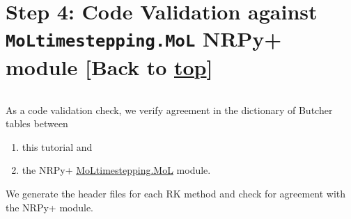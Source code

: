 \documentclass[landscape,letterpaper,10pt,english]{article}
\providecommand{\tightlist}{%
      \setlength{\itemsep}{0pt}\setlength{\parskip}{0pt}}
\begin{document}
    \hypertarget{step-4-code-validation-against-moltimestepping.mol-nrpy-module-back-to-top}{%
\section{\texorpdfstring{Step 4: Code Validation against
\texttt{MoLtimestepping.MoL} NRPy+ module {[}Back to
\hyperref[toc]{top}{]}}{Step 4: Code Validation against MoLtimestepping.MoL NRPy+ module {[}Back to {]}}}\label{step-4-code-validation-against-moltimestepping.mol-nrpy-module-back-to-top}}

\[\label{code_validation}\]

As a code validation check, we verify agreement in the dictionary of
Butcher tables between

\begin{enumerate}
\def\labelenumi{\arabic{enumi}.}
\tightlist
\item
  this tutorial and
\item
  the NRPy+ \href{../edit/MoLtimestepping/MoL.py}{MoLtimestepping.MoL}
  module.
\end{enumerate}

We generate the header files for each RK method and check for agreement
with the NRPy+ module.
\end{document}
